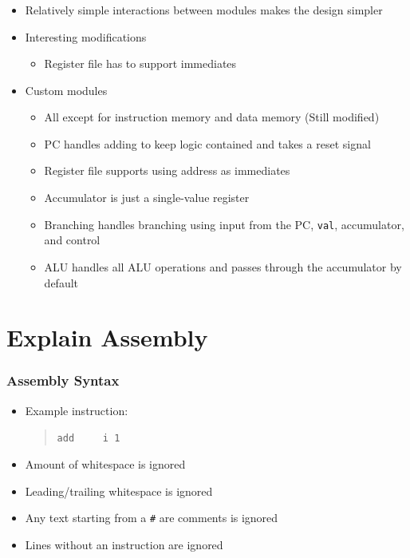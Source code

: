 	\begin{frame}
		\frametitle{}

		\begin{itemize}
			\item Relatively simple interactions between modules makes the design simpler
			\item Interesting modifications
				\begin{itemize}
					\item Register file has to support immediates
				\end{itemize}
			\item Custom modules
				\begin{itemize}
					\item All except for instruction memory and data memory (Still modified)
					\item PC handles adding to keep logic contained and takes a reset signal
					\item Register file supports using address as immediates
					\item Accumulator is just a single-value register
					\item Branching handles branching using input from the PC, \texttt{val}, accumulator, and control
					\item ALU handles all ALU operations and passes through the accumulator by default
				\end{itemize}
		\end{itemize}
	\end{frame}

	\section{Explain Assembly}

	\begin{frame}
		\frametitle{Assembly Syntax}

		\begin{itemize}
			\item Example instruction:
				\begin{quote}
					\texttt{add~~~~~i 1}
				\end{quote}
			\item Amount of whitespace is ignored
			\item Leading/trailing whitespace is ignored
			\item Any text starting from a \texttt{\#} are comments is ignored
			\item Lines without an instruction are ignored
		\end{itemize}

	\end{frame}

